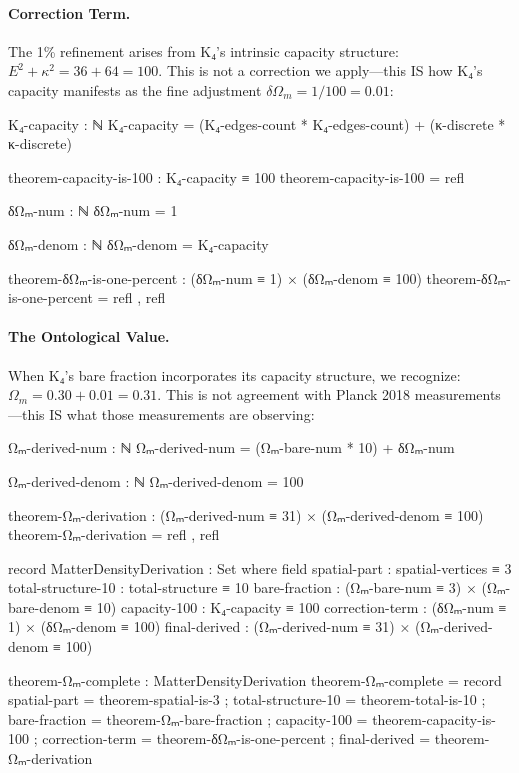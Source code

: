 \documentclass[11pt,a4paper]{book}
\begin{document}
\paragraph{Correction Term.}
The 1\% refinement arises from K₄'s intrinsic capacity structure: $E^2 + \kappa^2 = 36 + 64 = 100$. This is not a correction we apply—this IS how K₄'s capacity manifests as the fine adjustment $\delta\Omega_m = 1/100 = 0.01$:

\begin{code}
K₄-capacity : ℕ
K₄-capacity = (K₄-edges-count * K₄-edges-count) + (κ-discrete * κ-discrete)

theorem-capacity-is-100 : K₄-capacity ≡ 100
theorem-capacity-is-100 = refl

δΩₘ-num : ℕ
δΩₘ-num = 1

δΩₘ-denom : ℕ
δΩₘ-denom = K₄-capacity

theorem-δΩₘ-is-one-percent : (δΩₘ-num ≡ 1) × (δΩₘ-denom ≡ 100)
theorem-δΩₘ-is-one-percent = refl , refl
\end{code}

\paragraph{The Ontological Value.}
When K₄'s bare fraction incorporates its capacity structure, we recognize: $\Omega_m = 0.30 + 0.01 = 0.31$. This is not agreement with Planck 2018 measurements—this IS what those measurements are observing:

\begin{code}
Ωₘ-derived-num : ℕ
Ωₘ-derived-num = (Ωₘ-bare-num * 10) + δΩₘ-num

Ωₘ-derived-denom : ℕ
Ωₘ-derived-denom = 100

theorem-Ωₘ-derivation : (Ωₘ-derived-num ≡ 31) × (Ωₘ-derived-denom ≡ 100)
theorem-Ωₘ-derivation = refl , refl

record MatterDensityDerivation : Set where
  field
    spatial-part       : spatial-vertices ≡ 3
    total-structure-10 : total-structure ≡ 10
    bare-fraction      : (Ωₘ-bare-num ≡ 3) × (Ωₘ-bare-denom ≡ 10)
    capacity-100       : K₄-capacity ≡ 100
    correction-term    : (δΩₘ-num ≡ 1) × (δΩₘ-denom ≡ 100)
    final-derived      : (Ωₘ-derived-num ≡ 31) × (Ωₘ-derived-denom ≡ 100)

theorem-Ωₘ-complete : MatterDensityDerivation
theorem-Ωₘ-complete = record
  { spatial-part       = theorem-spatial-is-3
  ; total-structure-10 = theorem-total-is-10
  ; bare-fraction      = theorem-Ωₘ-bare-fraction
  ; capacity-100       = theorem-capacity-is-100
  ; correction-term    = theorem-δΩₘ-is-one-percent
  ; final-derived      = theorem-Ωₘ-derivation
  }
\end{code}
\end{document}
